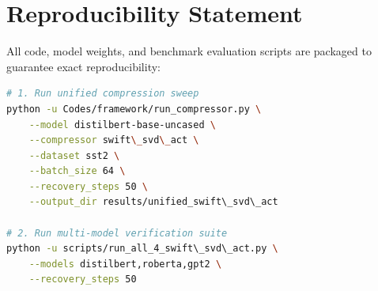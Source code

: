 \section{Reproducibility Statement}
All code, model weights, and benchmark evaluation scripts are packaged to guarantee exact reproducibility:
\begin{lstlisting}[language=bash]
# 1. Run unified compression sweep
python -u Codes/framework/run_compressor.py \
    --model distilbert-base-uncased \
    --compressor swift\_svd\_act \
    --dataset sst2 \
    --batch_size 64 \
    --recovery_steps 50 \
    --output_dir results/unified_swift\_svd\_act

# 2. Run multi-model verification suite
python -u scripts/run_all_4_swift\_svd\_act.py \
    --models distilbert,roberta,gpt2 \
    --recovery_steps 50
\end{lstlisting}

